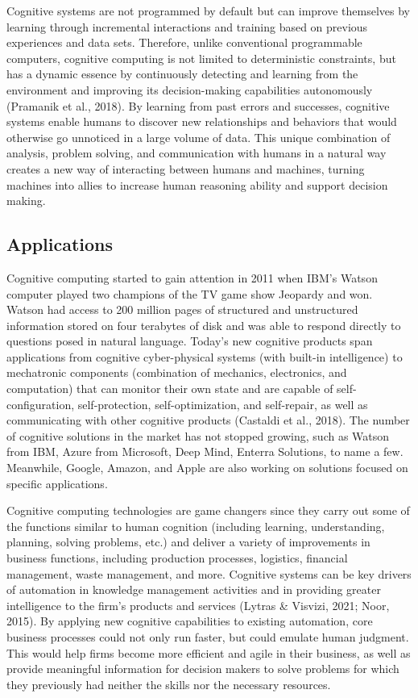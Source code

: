 \documentclass[
  letterpaper,
  DIV=11,
  numbers=noendperiod]{scrreprt}
\begin{document}
Cognitive systems are not programmed by default but can improve
themselves by learning through incremental interactions and training
based on previous experiences and data sets. Therefore, unlike
conventional programmable computers, cognitive computing is not limited
to deterministic constraints, but has a dynamic essence by continuously
detecting and learning from the environment and improving its
decision-making capabilities autonomously (Pramanik et al., 2018). By
learning from past errors and successes, cognitive systems enable humans
to discover new relationships and behaviors that would otherwise go
unnoticed in a large volume of data. This unique combination of
analysis, problem solving, and communication with humans in a natural
way creates a new way of interacting between humans and machines,
turning machines into allies to increase human reasoning ability and
support decision making.

\hypertarget{applications-2}{%
\subsection{Applications}\label{applications-2}}

Cognitive computing started to gain attention in 2011 when IBM's Watson
computer played two champions of the TV game show Jeopardy and won.
Watson had access to 200 million pages of structured and unstructured
information stored on four terabytes of disk and was able to respond
directly to questions posed in natural language. Today's new cognitive
products span applications from cognitive cyber-physical systems (with
built-in intelligence) to mechatronic components (combination of
mechanics, electronics, and computation) that can monitor their own
state and are capable of self-configuration, self-protection,
self-optimization, and self-repair, as well as communicating with other
cognitive products (Castaldi et al., 2018). The number of cognitive
solutions in the market has not stopped growing, such as Watson from
IBM, Azure from Microsoft, Deep Mind, Enterra Solutions, to name a few.
Meanwhile, Google, Amazon, and Apple are also working on solutions
focused on specific applications.

Cognitive computing technologies are game changers since they carry out
some of the functions similar to human cognition (including learning,
understanding, planning, solving problems, etc.) and deliver a variety
of improvements in business functions, including production processes,
logistics, financial management, waste management, and more. Cognitive
systems can be key drivers of automation in knowledge management
activities and in providing greater intelligence to the firm's products
and services (Lytras \& Visvizi, 2021; Noor, 2015). By applying new
cognitive capabilities to existing automation, core business processes
could not only run faster, but could emulate human judgment. This would
help firms become more efficient and agile in their business, as well as
provide meaningful information for decision makers to solve problems for
which they previously had neither the skills nor the necessary
resources.
\end{document}
